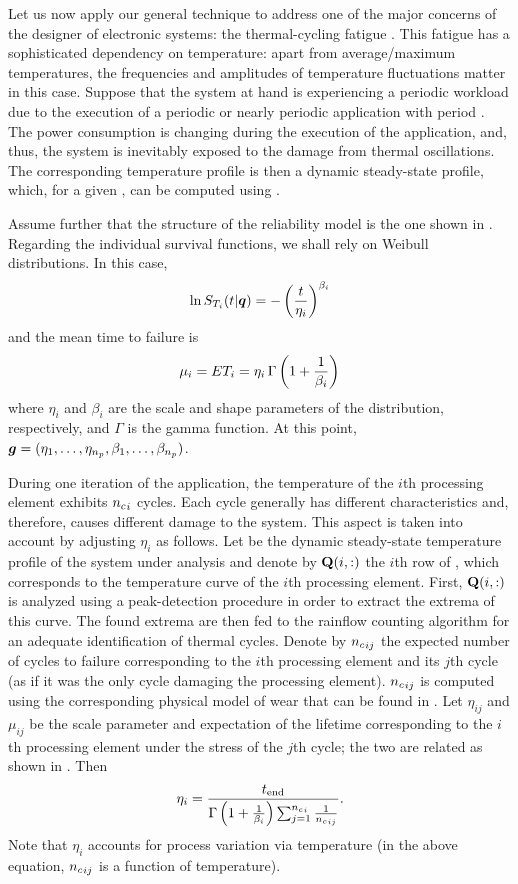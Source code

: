 Let us now apply our general technique to address one of the major concerns of
the designer of electronic systems: the thermal-cycling fatigue
\cite{jedec2016}. This fatigue has a sophisticated dependency on temperature:
apart from average/maximum temperatures, the frequencies and amplitudes of
temperature fluctuations matter in this case. Suppose that the system at hand is
experiencing a periodic workload due to the execution of a periodic or nearly
periodic application with period \period. The power consumption is changing
during the execution of the application, and, thus, the system is inevitably
exposed to the damage from thermal oscillations. The corresponding temperature
profile \mq is then a dynamic steady-state profile, which, for a given \vu, can
be computed using .

Assume further that the structure of the reliability model is the one shown in
. Regarding the individual survival functions, we shall
rely on Weibull distributions. In this case,
\[
  \ln S_{T_i}(t | \boldsymbol{q}) = -\left(\frac{t}{\eta_i}\right)^{\beta_i}
\]
and the mean time to failure is
\[
  \mu_i = \expectation{T_i} = \eta_i \, \Gamma\left(1 + \frac{1}{\beta_i}\right)
\]
where $\eta_i$ and $\beta_i$ are the scale and shape parameters of the
distribution, respectively, and $\Gamma$ is the gamma function. At this point,
$\boldsymbol{g} = (\eta_1, \dotsc, \eta_{n_{p}}, \beta_1, \dotsc, \beta_{n_{p}})$.

During one iteration of the application, the temperature of the $i$th processing
element exhibits ${n_{c}}_i$ cycles. Each cycle generally has different
characteristics and, therefore, causes different damage to the system. This
aspect is taken into account by adjusting $\eta_i$ as follows. Let \mq be the
dynamic steady-state temperature profile of the system under analysis and denote
by $\mathbf{Q}(i, :)$ the $i$th row of \mq, which corresponds to the temperature curve
of the $i$th processing element. First, $\mathbf{Q}(i, :)$ is analyzed using a
peak-detection procedure in order to extract the extrema of this curve. The
found extrema are then fed to the rainflow counting algorithm \cite{xiang2010}
for an adequate identification of thermal cycles. Denote by ${n_{c}}_{ij}$ the
expected number of cycles to failure corresponding to the $i$th processing
element and its $j$th cycle (as if it was the only cycle damaging the processing
element). ${n_{c}}_{ij}$ is computed using the corresponding physical model of wear
that can be found in \cite{ukhov2012, jedec, xiang2010}. Let $\eta_{ij}$ and
$\mu_{ij}$ be the scale parameter and expectation of the lifetime corresponding
to the $i$th processing element under the stress of the $j$th cycle; the two are
related as shown in . Then \cite{ukhov2012, xiang2010}
\[
  \eta_i = \frac{t_\mathrm{end}}{\Gamma\left(1 + \frac{1}{\beta_i}\right) \sum_{j = 1}^{{n_{c}}_i} \frac{1}{{n_{c}}_{ij}}}.
\]
Note that $\eta_i$ accounts for process variation via temperature (in the above
equation, ${n_{c}}_{ij}$ is a function of temperature).

